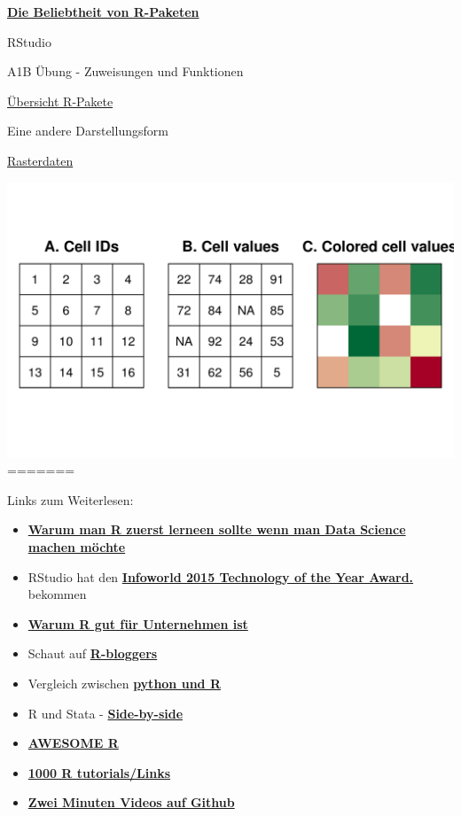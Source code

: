 \documentclass[ignorenonframetext,]{beamer}
\begin{document}
\begin{frame}{\href{https://gallery.shinyapps.io/cran-gauge/}{\textbf{Die
Beliebtheit von R-Paketen}}}
\begin{frame}{RStudio}
\begin{frame}[fragile]{A1B Übung - Zuweisungen und Funktionen}
\begin{frame}{\href{https://www.youtube.com/watch?v=kKI9--Opmso}{Übersicht
R-Pakete}}
\begin{frame}[fragile]{Eine andere Darstellungsform}
\end{frame}

\begin{frame}{\href{https://geocompr.robinlovelace.net/spatial-class.html}{Rasterdaten}}

\includegraphics{figure/raster-intro-plot-1.png}
=======
\begin{frame}{Links zum Weiterlesen:}
\protect\hypertarget{links-zum-weiterlesen}{}

\begin{itemize}
\item
  \href{http://www.r-bloggers.com/why-you-should-learn-r-first-for-data-science/}{\textbf{Warum
  man R zuerst lerneen sollte wenn man Data Science machen möchte}}
\item
  RStudio hat den
  \href{http://www.r-bloggers.com/rstudio-infoworld-2015-technology-of-the-year-award-recipient/}{\textbf{Infoworld
  2015 Technology of the Year Award.}} bekommen
\item
  \href{http://www.fastcolabs.com/3030063/why\%20the\%20r\%20programming\%20language\%20is\%20good\%20for\%20business}{\textbf{Warum
  R gut für Unternehmen ist}}
\item
  Schaut auf
  \href{http://www.r-bloggers.com/why-use-r/}{\textbf{R-bloggers}} 
\item
  Vergleich zwischen
  \href{http://www.dataschool.io/python-or-r-for-data-science/}{\textbf{python
  und R}}
\item
  R und Stata -
  \href{http://economistry.com/2013/11/r-impact-evaluation-r-stata-side-side/}{\textbf{Side-by-side}}
\item
  \href{https://awesome-r.com/}{\textbf{AWESOME R}}
\item
  \href{https://support.bioconductor.org/p/33781/}{\textbf{1000 R
  tutorials/Links}}
\item
  \href{https://www.youtube.com/playlist?list=PLcgz5kNZFCkzSyBG3H-rUaPHoBXgijHfC}{\textbf{Zwei
  Minuten Videos auf Github}}
\end{itemize}


\end{frame}
\end{frame}
\end{frame}
\end{frame}
\end{frame}
\end{frame}
\end{document}
